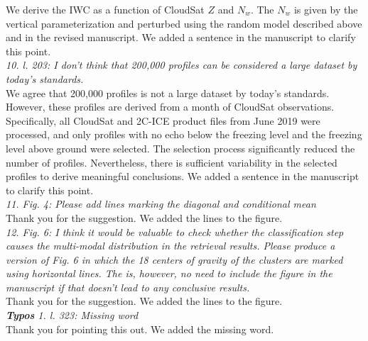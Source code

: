 \documentclass[12pt]{article}
\begin{document}
\newline
We derive the IWC as a function of CloudSat $Z$ and $N_w$.  The $N_w$ is given by the vertical parameterization and perturbed using the random model
described above and in the revised manuscript.  We added a sentence in the manuscript to clarify this point.\\
\newline
\textit{10. l. 203: I don't think that 200,000 profiles can be considered a large dataset by today's standards.}\\
\newline
We agree that 200,000 profiles is not a large dataset by today's standards.  However, these profiles are derived from a month of CloudSat observations.
Specifically, all CloudSat and 2C-ICE product files from June 2019 were processed, and only profiles with no echo below the freezing level
and the freezing level above ground were selected. The selection process significantly reduced the number of profiles. Nevertheless, there is sufficient
variability in the selected profiles to derive meaningful conclusions. We added a sentence in the manuscript to clarify this point.\\
\newline
\textit{11. Fig. 4: Please add lines marking the diagonal and conditional mean}\\
\newline
Thank you for the suggestion. We added the lines to the figure.\\
\newline   
\textit{12. Fig. 6: I think it would be valuable to check whether the classification step causes the multi-modal distribution 
    in the retrieval results. Please produce a version of Fig. 6 in which the 18 centers of gravity of the clusters 
    are marked using horizontal lines. The is, however, no need to include the figure in the manuscript if that doesn't lead
     to any conclusive results.}\\
\newline
Thank you for the suggestion.  We added the lines to the figure.\\
\newline  
\textit{\textbf{Typos}
    1. l. 323: Missing word}\\
\newline
Thank you for pointing this out.  We added the missing word.\\
\newline
\end{document}
